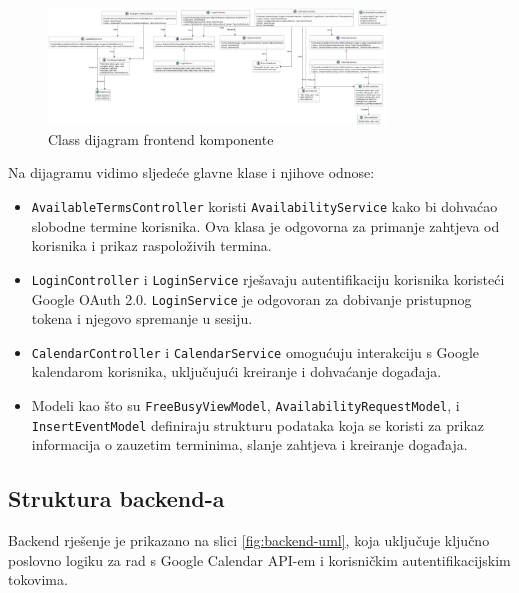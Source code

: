 \documentclass{foi}
\begin{document}
\begin{figure}[H]
    \centering
    \includegraphics[width=0.8\textwidth]{slike/MeetingPlannerFrontend_ClassUML.png}
    \caption{Class dijagram frontend komponente}
    \label{fig:frontend-uml}
\end{figure}

Na dijagramu vidimo sljedeće glavne klase i njihove odnose:
\begin{itemize}
    \item \texttt{AvailableTermsController} koristi \texttt{AvailabilityService} kako bi dohvaćao slobodne termine korisnika. Ova klasa je odgovorna za primanje zahtjeva od korisnika i prikaz raspoloživih termina.
    \item \texttt{LoginController} i \texttt{LoginService} rješavaju autentifikaciju korisnika koristeći Google OAuth 2.0. \texttt{LoginService} je odgovoran za dobivanje pristupnog tokena i njegovo spremanje u sesiju.
    \item \texttt{CalendarController} i \texttt{CalendarService} omogućuju interakciju s Google kalendarom korisnika, uključujući kreiranje i dohvaćanje događaja.
    \item Modeli kao što su \texttt{FreeBusyViewModel}, \texttt{AvailabilityRequestModel}, i \texttt{InsertEventModel} definiraju strukturu podataka koja se koristi za prikaz informacija o zauzetim terminima, slanje zahtjeva i kreiranje događaja.
\end{itemize}

\subsection{Struktura backend-a}

Backend rješenje je prikazano na slici \ref{fig:backend-uml}, koja uključuje ključno poslovno logiku za rad s Google Calendar API-em i korisničkim autentifikacijskim tokovima.
\end{document}
